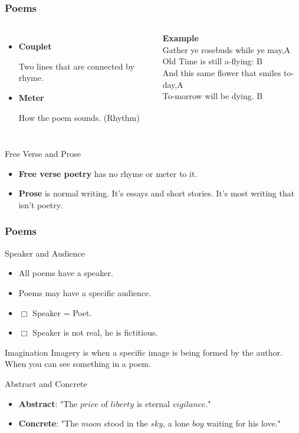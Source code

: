\documentclass{beamer}
\begin{document}
\begin{frame}
\frametitle{Poems}
\begin{columns}[c] %

\begin{itemize}
\item \textbf{Couplet}

Two lines that are connected by rhyme.
\item \textbf{Meter}

How the poem sounds. (Rhythm)
\end{itemize}

\textbf{Example}\\
Gather ye rosebuds while ye may,\qquad\qquad A\\
Old Time is still a-flying: \qquad\qquad\qquad\quad B\\
And this same flower that smiles to-day,\quad A\\
To-morrow will be dying. \qquad\qquad\qquad\quad B
\end{columns}
\vspace{4ex}
\begin{block}{Free Verse and Prose}
\begin{itemize}
\item \textbf{Free verse poetry} has no rhyme or meter to it. 
\item \textbf{Prose} is normal writing. It's essays and short stories. It's most writing that isn't poetry.
\end{itemize}
\end{block}

\end{frame}
\begin{frame}
\frametitle{Poems}
\begin{block}{Speaker and Audience}
\begin{itemize}
\item All poems have a speaker.
\item Poems may have a specific audience.
\item $\Box$ Speaker = Poet.
\item $\Box$ Speaker is not real, he is fictitious.
\end{itemize}
\end{block}

\begin{block}{Imagination}
Imagery is when a specific image is being formed by the author. When you can see something in a poem.
\end{block}

\begin{block}{Abstract and Concrete}
\begin{itemize}
\item \textbf{Abstract}: "The $price$ of $liberty$ is eternal $vigilance$."
\item \textbf{Concrete}: "The $moon$ stood in the $sky$, a lone $boy$ waiting for his love."
\end{itemize}
\end{block}
\end{frame}
\end{document}
